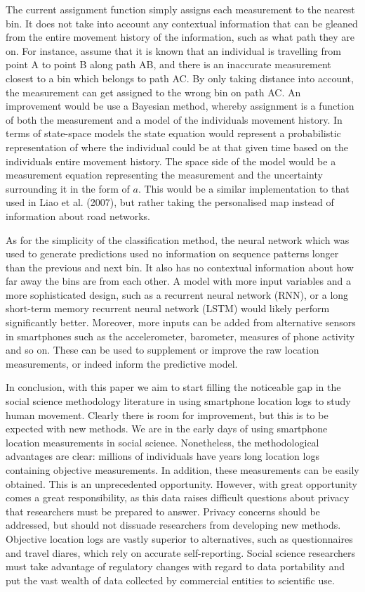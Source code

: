 \documentclass[man]{apa6}
\theoremstyle{definition}
\theoremstyle{definition}
\theoremstyle{definition}
\theoremstyle{remark}
\begin{document}
The current assignment function simply assigns each measurement to the
nearest bin. It does not take into account any contextual information
that can be gleaned from the entire movement history of the information,
such as what path they are on. For instance, assume that it is known
that an individual is travelling from point A to point B along path AB,
and there is an inaccurate measurement closest to a bin which belongs to
path AC. By only taking distance into account, the measurement can get
assigned to the wrong bin on path AC. An improvement would be use a
Bayesian method, whereby assignment is a function of both the
measurement and a model of the individuals movement history. In terms of
state-space models the state equation would represent a probabilistic
representation of where the individual could be at that given time based
on the individuals entire movement history. The space side of the model
would be a measurement equation representing the measurement and the
uncertainty surrounding it in the form of \(a\). This would be a similar
implementation to that used in Liao et al. (2007), but rather taking the
personalised map instead of information about road networks.

As for the simplicity of the classification method, the neural network
which was used to generate predictions used no information on sequence
patterns longer than the previous and next bin. It also has no
contextual information about how far away the bins are from each other.
A model with more input variables and a more sophisticated design, such
as a recurrent neural network (RNN), or a long short-term memory
recurrent neural network (LSTM) would likely perform significantly
better. Moreover, more inputs can be added from alternative sensors in
smartphones such as the accelerometer, barometer, measures of phone
activity and so on. These can be used to supplement or improve the raw
location measurements, or indeed inform the predictive model.

In conclusion, with this paper we aim to start filling the noticeable
gap in the social science methodology literature in using smartphone
location logs to study human movement. Clearly there is room for
improvement, but this is to be expected with new methods. We are in the
early days of using smartphone location measurements in social science.
Nonetheless, the methodological advantages are clear: millions of
individuals have years long location logs containing objective
measurements. In addition, these measurements can be easily obtained.
This is an unprecedented opportunity. However, with great opportunity
comes a great responsibility, as this data raises difficult questions
about privacy that researchers must be prepared to answer. Privacy
concerns should be addressed, but should not dissuade researchers from
developing new methods. Objective location logs are vastly superior to
alternatives, such as questionnaires and travel diares, which rely on
accurate self-reporting. Social science researchers must take advantage
of regulatory changes with regard to data portability and put the vast
wealth of data collected by commercial entities to scientific use.
\end{document}
